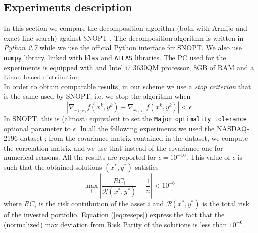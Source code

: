 
\subsection{Experiments description}
In this section we compare the decomposition algorithm (both with Armijo and exact line search) against SNOPT \cite{snopt}.
The decomposition algorithm is written in \textit{Python 2.7} while we use the official Python interface for SNOPT. We also use \texttt{numpy} library, linked with \texttt{blas} and \texttt{ATLAS} libraries. The PC used for the experiments is equipped with and Intel i7 3630QM processor, 8GB of RAM and a Linux based distribution.\\
In order to obtain comparable results, in our scheme we use a \textit{stop criterion} that is the same used by SNOPT, i.e. we stop the algorithm when
\begin{equation}
\left| \nabla_{x_{j(k)}} f(x^k,y^k) - \nabla_{x_{i(k)}} f(x^k,y^k)\right| < \epsilon
\end{equation}
In SNOPT, this is (almost) equivalent to set the \texttt{Major optimality tolerance} optional parameter to $\epsilon$. 
In all the following experiments we used the NASDAQ-2196 dataset \cite{nasdaq}; from the covariance matrix contained in the dataset, we compute the correlation matrix and we use that instead of the covariance one for numerical reasons.
All the results are reported for $\epsilon = 10^{-10}$. This value of $\epsilon$ is such that the obtained solutions $(x^*,y^*)$ satisfies
\begin{equation}\label{eq:reseps}
\max_i \left| \frac{RC_i}{\mathcal{R}(x^*,y^*)} - \frac{1}{n} \right| < 10^{-6}
\end{equation}
where $RC_i$ is the risk contribution of the asset $i$ and ${\mathcal{R}(x^*,y^*)}$ is the total risk of the invested portfolio. Equation (\ref{eq:reseps}) express the fact that the (normalized) max deviation from Risk Parity of the solutions is less than $10^{-6}$.

